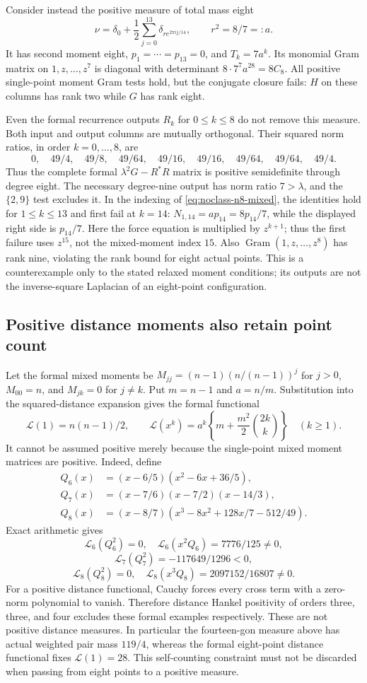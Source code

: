 \documentclass[11pt]{article}
\theoremstyle{remark}
\numberwithin{equation}{section}
\begin{document}
Consider instead the positive measure of total mass eight
\[
 \nu=\delta_0+\frac12\sum_{j=0}^{13}\delta_{r e^{2\pi ij/14}},
 \qquad r^2=8/7=:a.
\]
It has second moment eight, $p_1=\cdots=p_{13}=0$, and $T_k=7a^k$.
Its monomial Gram matrix on $1,z,\ldots,z^7$ is diagonal with
determinant $8\cdot7^7a^{28}=8C_8$. All positive single-point
moment Gram tests hold, but the conjugate closure fails: $H$ on
these columns has rank two while $G$ has rank eight.

Even the formal recurrence outputs $R_k$ for $0\le k\le8$ do not
remove this measure. Both input and output columns are mutually
orthogonal. Their squared norm ratios, in order $k=0,\ldots,8$,
are
\[
 0,\quad49/4,\quad49/8,\quad49/64,\quad49/16,\quad
 49/16,\quad49/64,\quad49/64,\quad49/4.
\]
Thus the complete formal $\lambda^2G-R^*R$ matrix is positive
semidefinite through degree eight. The necessary degree-nine
output has norm ratio $7>\lambda$, and the $\{2,9\}$ test excludes
it. In the indexing of \eqref{eq:noclass-n8-mixed}, the identities
hold for $1\le k\le13$ and first fail at $k=14$:
$N_{1,14}=a p_{14}=8p_{14}/7$, while the displayed right side is
$p_{14}/7$. Here the force equation is multiplied by $z^{k+1}$;
thus the first failure uses $z^{15}$, not the mixed-moment index $15$.
Also $\operatorname{Gram}(1,z,\ldots,z^8)$ has rank nine, violating
the rank bound for eight actual points. This is a counterexample
only to the stated relaxed moment conditions; its outputs are not
the inverse-square Laplacian of an eight-point configuration.

\subsection{Positive distance moments also retain point count}
Let the formal mixed moments be $M_{jj}=(n-1)(n/(n-1))^j$ for $j>0$,
$M_{00}=n$, and $M_{jk}=0$ for $j\ne k$. Put $m=n-1$ and $a=n/m$.
Substitution into the squared-distance expansion gives the formal
functional
\[
 \mathcal L(1)=n(n-1)/2,\qquad
 \mathcal L(x^k)=a^k\left\{m+\frac{m^2}{2}\binom{2k}{k}\right\}
 \quad(k\ge1).
\]
It cannot be assumed positive merely because the single-point mixed
moment matrices are positive. Indeed, define
\begin{align*}
 Q_6(x)&=(x-6/5)(x^2-6x+36/5),\\
 Q_7(x)&=(x-7/6)(x-7/2)(x-14/3),\\
 Q_8(x)&=(x-8/7)(x^3-8x^2+128x/7-512/49).
\end{align*}
Exact arithmetic gives
\[
 \mathcal L_6(Q_6^2)=0,\quad
 \mathcal L_6(x^2Q_6)=7776/125\ne0,
\]
\[
 \mathcal L_7(Q_7^2)=-117649/1296<0,
\]
\[
 \mathcal L_8(Q_8^2)=0,\quad
 \mathcal L_8(x^3Q_8)=2097152/16807\ne0.
\]
For a positive distance functional, Cauchy forces every cross term
with a zero-norm polynomial to vanish. Therefore distance Hankel
positivity of orders three, three, and four excludes these formal
examples respectively. These are not positive distance measures.
In particular the fourteen-gon measure above has actual weighted
pair mass $119/4$, whereas the formal eight-point distance functional
fixes $\mathcal L(1)=28$. This self-counting constraint must not be
discarded when passing from eight points to a positive measure.
\end{document}

